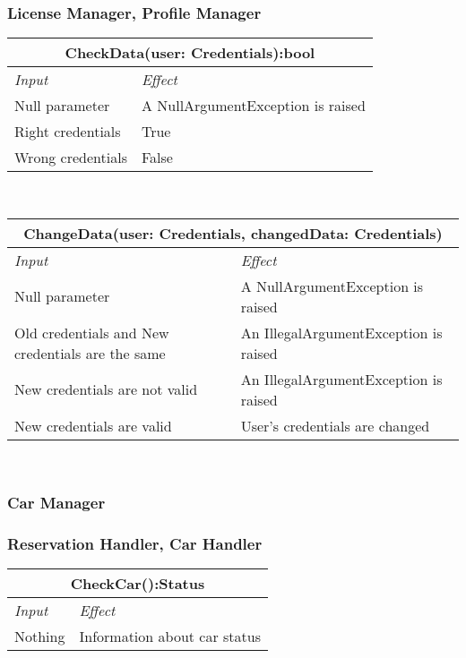 			\subsubsection*{License Manager, Profile Manager}
			\begin{tabular}{ |l|l| }
				\hline
				\multicolumn{2}{|c|}{CheckData(user: Credentials):bool}\\
				\hline 
				\textit{Input}&\textit{Effect}\\ \hline
				Null parameter & A NullArgumentException is raised\\ \hline
				Right credentials & True\\ \hline
				Wrong credentials & False\\ \hline
			\end{tabular}
			\\
			\begin{tabular}{ |l|l| }
				\hline
				\multicolumn{2}{|c|}{ChangeData(user: Credentials, changedData: Credentials)}\\
				\hline
				\textit{Input}&\textit{Effect}\\ \hline
				Null parameter & A NullArgumentException is raised\\ \hline
				Old credentials and New credentials are the same & An IllegalArgumentException is raised \\ \hline
				New credentials are not valid & An IllegalArgumentException is raised\\ \hline
				New credentials are valid & User's credentials are changed \\ \hline
			\end{tabular}
			\\	
		
		
		
		
		
		\subsubsection{Car Manager}		
			\subsubsection*{Reservation Handler, Car Handler}
			\begin{tabular}{ |l|l| }
				\hline
				\multicolumn{2}{|c|}{CheckCar():Status}\\
				\hline
				\textit{Input}&\textit{Effect}\\ \hline
				Nothing & Information about car status \\ \hline
			\end{tabular}
			\\
			
